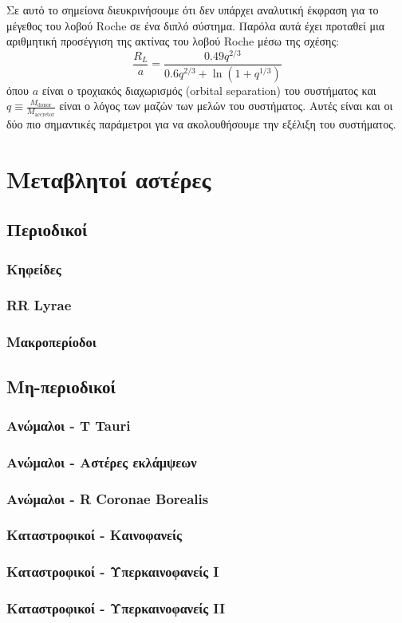 Σε αυτό το σημείονα διευκρινήσουμε ότι δεν υπάρχει αναλυτική έκφραση για το μέγεθος του λοβού Roche σε ένα διπλό σύστημα. Παρόλα αυτά έχει προταθεί μια αριθμητική προσέγγιση της ακτίνας του λοβού Roche μέσω της σχέσης:
$$\frac{R_L}{a} = \frac{0.49q^{2/3}}{0.6q^{2/3} + \ln (1 + q^{1/3})}$$
όπου $a$ είναι ο τροχιακός διαχωρισμός (orbital separation) του συστήματος και $\displaystyle q \equiv \frac{M_{\text{donor}}}{M_{\text{accretor}}}$ είναι ο λόγος των μαζών των μελών του συστήματος.
Αυτές είναι και οι δύο πιο σημαντικές παράμετροι για να ακολουθήσουμε την εξέλιξη του συστήματος.













\section{Μεταβλητοί αστέρες}
\subsection{Περιοδικοί}
\subsubsection{Κηφείδες}
\subsubsection{RR Lyrae}
\subsubsection{Μακροπερίοδοι}

\subsection{Μη-περιοδικοί}
\subsubsection{Ανώμαλοι - T Tauri}
\subsubsection{Ανώμαλοι - Αστέρες εκλάμψεων}
\subsubsection{Ανώμαλοι - R Coronae Borealis}
\subsubsection{Καταστροφικοί - Καινοφανείς}
\subsubsection{Καταστροφικοί - Υπερκαινοφανείς I}
\subsubsection{Καταστροφικοί - Υπερκαινοφανείς II}
